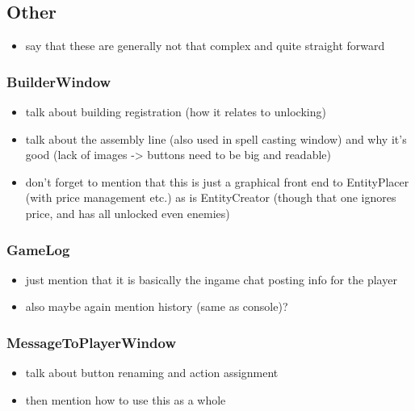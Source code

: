 \subsection{Other}

\begin{itemize}
    \item say that these are generally not that complex and quite straight forward
\end{itemize}

\subsubsection{BuilderWindow}

\begin{itemize}
    \item talk about building registration (how it relates to unlocking)
    \item talk about the assembly line (also used in spell casting window)
        and why it's good (lack of images -> buttons need to be big and readable)
    \item don't forget to mention that this is just a graphical front end
        to EntityPlacer (with price management etc.) as is EntityCreator (though
        that one ignores price, and has all unlocked even enemies)
\end{itemize}

\subsubsection{GameLog}

\begin{itemize}
    \item just mention that it is basically the ingame chat posting info
        for the player
    \item also maybe again mention history (same as console)?
\end{itemize}

\subsubsection{MessageToPlayerWindow}

\begin{itemize}
    \item talk about button renaming and action assignment
    \item then mention how to use this as a whole
\end{itemize}

